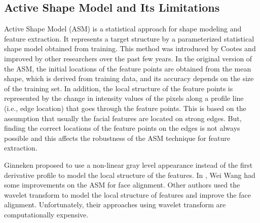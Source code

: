 \subsection{Active Shape Model and Its Limitations}
\label{asm_and_limmitation} Active Shape Model (ASM) is a
statistical approach for shape modeling and feature extraction. It
represents a target structure by a parameterized statistical shape
model obtained from training. This method was introduced by Cootes
\etal \cite{Cootes_1,Cootes_2} and improved by other researchers
over the past few years. In the original version of the ASM, the
initial locations of the feature points are obtained from the mean
shape, which is derived from training data, and its accuracy depends
on the size of the training set. In addition, the local structure of
the feature points is represented by the change in intensity values
of the pixels along a profile line (i.e., edge location) that goes
through the feature points. This is based on the assumption that
usually the facial features are located on strong edges. But,
finding the correct locations of the feature points on the edges is
not always possible and this affects the robustness of the ASM
technique for feature extraction.

Ginneken \etal \cite{Bram_Ginneken01} proposed to use a non-linear
gray level appearance instead of the first derivative profile to
model the local structure of the features. In
\cite{ImprovedASM_2002}, Wei Wang \etal had some improvements on the
ASM for face alignment. Other authors \cite{ASM_Wavelet03_1,
ASM_Wavelet03_2, ASM_Wavelet03_3} used the wavelet transform to
model the local structure of features and improve the face
alignment. Unfortunately, their approaches using wavelet transform
are computationally expensive.

